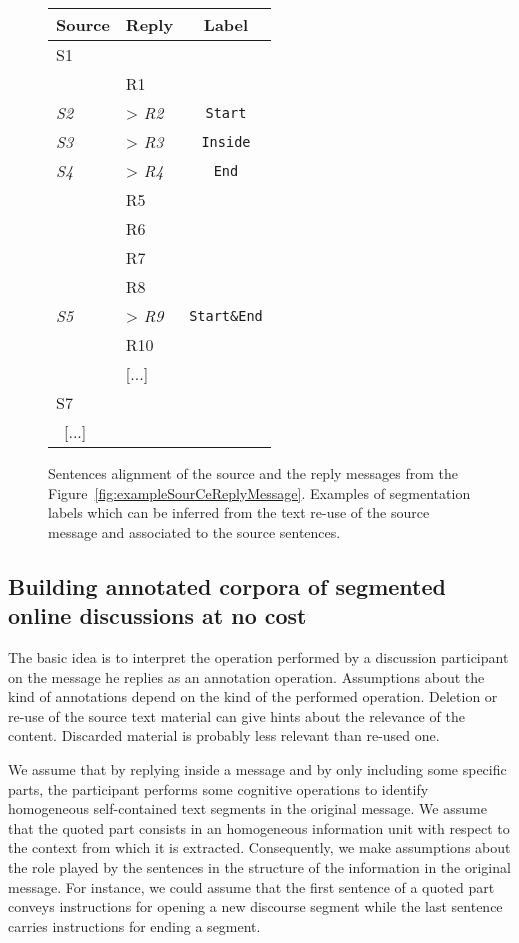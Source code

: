\begin{figure}\small\centering
\begin{tabular}{*{2}{|l}|c|}
\toprule
\textbf{Source} & \textbf{Reply} & \textbf{Label}\\
	\midrule
S1  & & \\
    & R1 & \\
\textit{S2}  & > \textit{R2}& \texttt{Start}\\
\textit{S3}  & > \textit{R3}& \texttt{Inside}\\
\textit{S4}  & > \textit{R4}& \texttt{End}\\
    & R5 & \\
    & R6 & \\
    & R7 & \\
    & R8 & \\
\textit{S5}  & > \textit{R9} & \texttt{Start\&End}\\
    & R10 & \\
    & [...] & \\
S7    &  & \\ \ 
[...] \    &  & \\
	\bottomrule
\end{tabular}

\caption{Sentences alignment of the source and the reply messages from the Figure~\ref{fig:exampleSourCeReplyMessage}. Examples of segmentation labels which can be inferred from the text re-use of the source message and associated to the source sentences.}
\label{fig:exampleSegmentationLabels}
\end{figure}


\subsection{Building annotated corpora of segmented online discussions at no cost}
\label{}

The basic idea is to interpret the operation performed by a discussion participant on the message he replies as an annotation operation. 
Assumptions about the kind of annotations depend on the kind of the performed operation.
Deletion or re-use of the source text material can give hints about the relevance of the content. Discarded material is probably less relevant than re-used one.

We assume that by replying inside a message and by only including some specific parts, the participant performs some cognitive operations to identify homogeneous self-contained text segments in the original message.
We assume that the quoted part consists in an homogeneous information unit with respect to the context from which it is extracted. 
Consequently, we make assumptions about the role played by the sentences in the structure of the information in the original message.
For instance, we could assume that the first sentence of a quoted part conveys instructions for opening a new discourse segment while the last sentence carries instructions for ending a segment.

